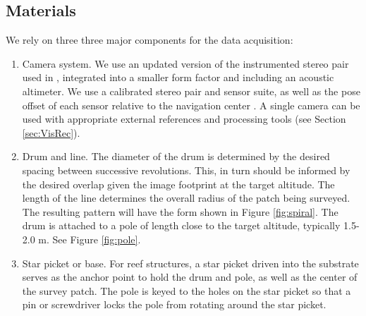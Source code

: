 
\subsection{Materials}
We rely on three three major components for the data acquisition:
\begin{enumerate}
\item Camera system. We use an updated version of the instrumented stereo pair used in \cite{Henderson_2013} \cite{Camilli_2007}, integrated into a smaller form factor and including an acoustic altimeter. We use a calibrated stereo pair and sensor suite, as well as the pose offset of each sensor relative to the navigation center \cite{Johnson_Roberson_2013} \cite{Mahon_2008}. A single camera can be used with appropriate external references and processing tools (see Section \ref{sec:VisRec}).
\item Drum and line. The diameter of the drum is determined by the desired spacing between successive revolutions. This, in turn should be informed by the desired overlap given the image footprint at the target altitude. The length of the line determines the overall radius of the patch being surveyed. The resulting pattern will have the form shown in Figure \ref{fig:spiral}. The drum is attached to a pole of length close to the target altitude, typically 1.5-2.0 m. See Figure \ref{fig:pole}.




\item Star picket or base. For reef structures, a star picket driven into the substrate serves as the anchor point to hold the drum and pole, as well as the center of the survey patch. The pole is keyed to the holes on the star picket so that a pin or screwdriver locks the pole from rotating around the star picket.

\end{enumerate}


  